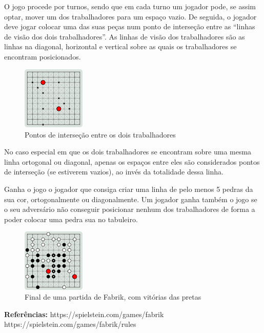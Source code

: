\documentclass[a4paper]{article}
\begin{document}
O jogo procede por turnos, sendo que em cada turno um jogador pode, se assim optar, mover um dos trabalhadores para um espaço vazio. De seguida, o jogador deve jogar colocar uma das suas peças num ponto de interseção entre as “linhas de visão dos dois trabalhadores”. As linhas de visão dos trabalhadores são as linhas na diagonal, horizontal e vertical sobre as quais os trabalhadores se encontram posicionados.

\begin{figure}[h!]
\begin{center}
\includegraphics[height=3cm,width=3cm]{images/fabrik_intersection.png}
\caption{Pontos de interseção entre os dois trabalhadores}
\label{Figura 2}
\end{center}
\end{figure}

No caso especial em que os dois trabalhadores se encontram sobre uma mesma linha ortogonal ou diagonal, apenas os espaços entre eles são considerados pontos de interseção (se estiverem vazios), ao invés da totalidade dessa linha.

Ganha o jogo o jogador que consiga criar uma linha de pelo menos 5 pedras da sua cor, ortogonalmente ou diagonalmente. Um jogador ganha também o jogo se o seu adversário não conseguir posicionar nenhum dos trabalhadores de forma a poder colocar uma pedra sua no tabuleiro.

\begin{figure}[h!]
\begin{center}
\includegraphics[height=3cm,width=3cm]{images/fabrik_full_board.png}
\caption{Final de uma partida de Fabrik, com vitórias das pretas}
\label{Figura 3}
\end{center}
\end{figure}

\vfill
\textbf{Referências:}\newline
https://spielstein.com/games/fabrik\newline
https://spielstein.com/games/fabrik/rules
\end{document}
